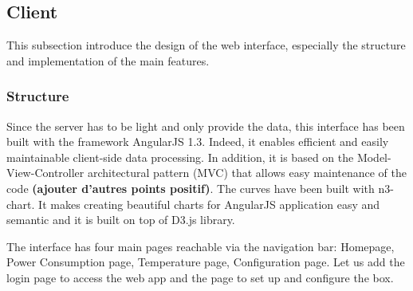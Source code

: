 \subsection{Client} %

This subsection introduce the design of the web interface, especially the structure and implementation of the main features.

\subsubsection{Structure}
    Since the server has to be light and only provide the data, this interface has been built with the framework AngularJS 1.3. Indeed, it enables efficient and easily maintainable client-side data processing. In addition, it is based on the Model-View-Controller architectural pattern (MVC) that allows easy maintenance of the code \textbf{(ajouter d'autres points positif)}. The curves have been built with n3-chart. It makes creating beautiful charts for AngularJS application easy and semantic and it is built on top of D3.js library.
    
    The interface has four main pages reachable via the navigation bar: Homepage, Power Consumption page, Temperature page, Configuration page. Let us add the login page to access the web app and the page to set up and configure the box.
     
    \begin{figure}[!h]
        \centering
    \end{figure}

